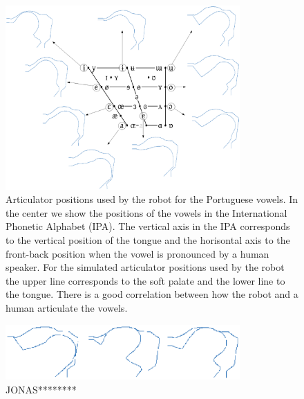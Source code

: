 \begin{figure}
\centering
\includegraphics[width=0.8\textwidth]{include/babbling/images/vowels.eps}
\caption{Articulator positions used by the robot for the
  Portuguese vowels. In the center we show the positions of the vowels
  in the International Phonetic Alphabet (IPA). The vertical axis in
  the IPA corresponds to the vertical position of the tongue and the
  horisontal axis to the front-back position when the vowel is
  pronounced by a human speaker. For the simulated articulator
  positions used by the robot the upper line corresponds to the soft
  palate and the lower line to the tongue. There is a good correlation
  between how the robot and a human articulate the vowels.}
\label{fig:babbling:positions}
\end{figure}

\begin{figure}
\centering
\includegraphics[width=0.8\textwidth]{include/babbling/images/cardinal.eps}
\caption{JONAS********}
\label{fig:babbling:cardinal}
\end{figure}


\endinput
